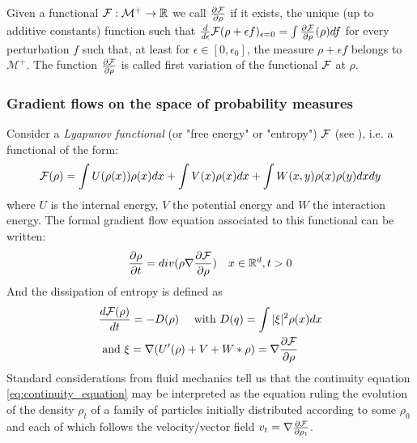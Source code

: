 Given a functional ${{\mathcal F}} : \mathcal{M}^+ \rightarrow {{\mathbb R}}$ we call $\frac{\partial{{{\mathcal F}}}}{\partial{\rho}}$ if it exists, the unique (up to additive constants) function such that $\frac{d}{d\epsilon}{{\mathcal F}}(\rho+\epsilon  f)_{\epsilon=0}=\int\frac{\partial{{{\mathcal F}}}}{\partial{\rho}}(\rho) df$ for every perturbation $f$ such that, at least for $\epsilon \in [0, \epsilon_0]$, the measure $\rho +\epsilon f$ belongs to $\mathcal{M}^+$. The function $\frac{\partial{{{\mathcal F}}}}{\partial{\rho}}$ is called first variation of the functional ${{\mathcal F}}$ at $\rho$.

\subsubsection{Gradient flows on the space of probability measures}

Consider a \textit{Lyapunov functional} (or "free energy" or "entropy") ${{\mathcal F}}$ (see \citep{Villani:2004}), i.e. a functional of the form:
\begin{equation}\label{eq:lyapunov}
{{\mathcal F}}(\rho)=\int U(\rho(x)) \rho(x)dx + \int V(x)\rho(x)dx + \int W(x,y)\rho(x)\rho(y)dxdy
\end{equation}
where  $U$ is the internal energy, $V$ the potential energy and $W$ the
interaction energy. The formal gradient flow equation associated to this functional can be written:
\begin{equation}\label{eq:continuity_equation}
\frac{\partial \rho}{\partial t}= div( \rho \nabla \frac{\partial {{\mathcal F}}}{\partial \rho}) \quad x \in {{\mathbb R}}^d , t>0
\end{equation}
And the dissipation of entropy is defined as %
\begin{align}
&        \frac{d {{\mathcal F}}(\rho)}{dt} =-D(\rho) \quad \text{ with } D(q)= \int |\xi|^2 \rho(x)dx\\
&\text{ and } \xi= \nabla (U'(\rho) + V + W * \rho)= \nabla \frac{\partial {{\mathcal F}}}{\partial \rho}
\end{align}
Standard considerations from fluid mechanics tell us that the continuity equation \eqref{eq:continuity_equation} may be interpreted as the equation ruling the evolution of the density $\rho_t$ of a family of particles initially distributed according to some $\rho_0$ and each of which follows the velocity/vector field $v_t=\nabla \frac{\partial{{{\mathcal F}}}}{\partial{\rho_t}}$.


